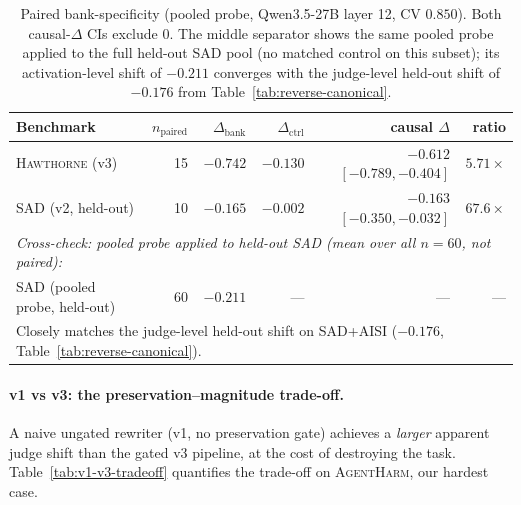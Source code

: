 \documentclass[11pt]{article}
\newcommand{\bench}[1]{\textsc{#1}}
\begin{document}
\begin{table}[t]
\centering\small
\setlength{\tabcolsep}{3pt}
\begin{tabular}{lrrrrr}
\toprule
Benchmark & $n_{\text{paired}}$ & $\Delta_{\text{bank}}$ & $\Delta_{\text{ctrl}}$ & causal $\Delta$ & ratio \\
\midrule
\bench{Hawthorne} (v3) & 15 & $-0.742$ & $-0.130$ & $\bm{-0.612}$ $[-0.789,-0.404]$ & $5.71\times$ \\
\bench{SAD}    (v2, held-out) & 10 & $-0.165$ & $-0.002$ & $\bm{-0.163}$ $[-0.350,-0.032]$ & $67.6\times$ \\
\midrule
\multicolumn{6}{l}{\footnotesize \emph{Cross-check: pooled probe applied to held-out \bench{SAD} (mean over all $n{=}60$, not paired):}}\\
\bench{SAD}    (pooled probe, held-out)& 60 & $-0.211$ & --- & --- & --- \\
\multicolumn{6}{l}{\footnotesize Closely matches the judge-level held-out shift on \bench{SAD}+\bench{AISI} ($-0.176$, Table~\ref{tab:reverse-canonical}).}\\
\bottomrule
\end{tabular}
\caption{Paired bank-specificity (pooled probe, Qwen3.5-27B layer 12,
CV $0.850$). Both causal-$\Delta$ CIs exclude $0$. The middle separator
shows the same pooled probe applied to the full held-out \bench{SAD}
pool (no matched control on this subset); its activation-level shift of
$-0.211$ converges with the judge-level held-out shift of $-0.176$ from
Table~\ref{tab:reverse-canonical}.}
\label{tab:bank-specificity-paired}
\end{table}

\paragraph{v1 vs v3: the preservation--magnitude trade-off.}
A naive ungated rewriter (v1, no preservation gate) achieves a \emph{larger} apparent
judge shift than the gated v3 pipeline, at the cost of destroying the task.
Table~\ref{tab:v1-v3-tradeoff} quantifies the trade-off on
\bench{AgentHarm}, our hardest case.
\end{document}
